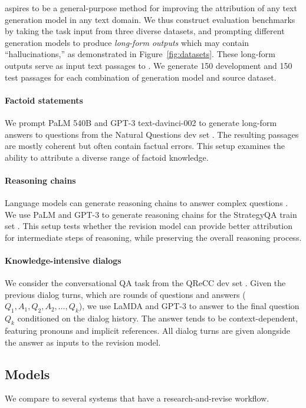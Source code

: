 \documentclass[11pt]{article}
\begin{document}
\approach{} aspires to be a general-purpose method for improving the attribution of any text generation model in any text domain.
We thus construct evaluation benchmarks by taking the task input from three diverse datasets,
and prompting different generation models to produce \emph{long-form outputs} which may contain ``hallucinations,''
as demonstrated in Figure~\ref{fig:datasets}.
These long-form outputs serve as input text passages to \approach{}.
We generate 150 development and 150 test passages for each combination of generation model and source dataset. %






\paragraph{Factoid statements}
We prompt PaLM 540B and GPT-3 text-davinci-002 to generate long-form answers to questions from the Natural Questions dev set \cite[NQ;][]{Kwiatkowski2019NaturalQA}. The resulting passages are mostly coherent but often contain factual errors. This setup examines the ability to attribute a diverse range of factoid knowledge.

\paragraph{Reasoning chains}
Language models can generate reasoning chains to answer complex questions \cite{Wei2022COT}. We use PaLM and GPT-3 to generate reasoning chains for the StrategyQA train set \cite[SQA;][]{Geva2021DidAU}.
This setup tests whether the revision model can provide better attribution for intermediate steps of reasoning, while preserving the overall reasoning process.

\paragraph{Knowledge-intensive dialogs}
We consider the conversational QA task from the QReCC dev set \cite{Anantha2021QReCCQ}.
Given the previous dialog turns, which are rounds of questions and answers ($Q_1, A_1, Q_2, A_2, \dots, Q_k$), we use LaMDA and GPT-3 to answer %
to the final question $Q_k$ conditioned on the dialog history.
The answer tends to be context-dependent, featuring pronouns and implicit references. All dialog turns are given alongside the answer as inputs to the revision model.




\subsection{Models}\label{sec:baselines}
We compare \approach{} to several systems that have a research-and-revise workflow.
\end{document}
